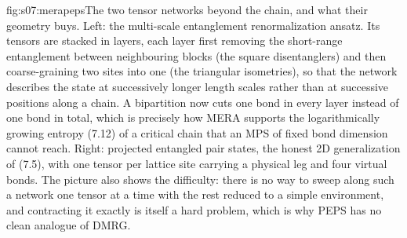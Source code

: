 %
\begin{aqmfigure}{fig:s07:merapeps}{The two tensor networks beyond the chain, and what their geometry
buys. Left: the multi-scale entanglement renormalization ansatz. Its tensors are stacked in layers,
each layer first removing the short-range entanglement between neighbouring blocks (the square
disentanglers) and then coarse-graining two sites into one (the triangular isometries), so that the
network describes the state at successively longer length scales rather than at successive positions
along a chain. A bipartition now cuts one bond in every layer instead of one bond in total, which is
precisely how MERA supports the logarithmically growing entropy (7.12) of a critical chain that an
MPS of fixed bond dimension cannot reach. Right: projected entangled pair states, the honest 2D
generalization of (7.5), with one tensor per lattice site carrying a physical leg and four virtual
bonds. The picture also shows the difficulty: there is no way to sweep along such a network one
tensor at a time with the rest reduced to a simple environment, and contracting it exactly is itself
a hard problem, which is why PEPS has no clean analogue of DMRG.}

\end{aqmfigure}
